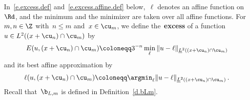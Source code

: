 \documentclass[11pt]{amsart}
\begin{document}
In~\eqref{e.excess.def} and~\eqref{e.excess.affine.def} below,~$\ell$ denotes an affine function on~$\Rd$, and the minimum and the minimizer are taken over all affine functions.  For~$m,n \in \Z$ with~$n \leq m$ and~$x \in \cu_m$, we define the~\textbf{excess} of a function~$u\in L^2((x +\cu_n) \cap \cu_m)$ by
\begin{equation}
	E(u,(x +\cu_n) \cap \cu_m)  \coloneqq
	3^{-n}
	\min_{\ell}
	\| u - \ell \|_{\underline{L}^2((x +\cu_n) \cap \cu_m)}
	\label{e.excess.def}
\end{equation}
and its best affine approximation by
\begin{equation}
	\ell (u,(x +\cu_n) \cap \cu_m)   \coloneqq  \argmin_{\ell}
	\| u - \ell \|_{\underline{L}^2((x +\cu_n) \cap \cu_m)}
	\,.
	\label{e.excess.affine.def}
\end{equation}
Recall that~$\b_{L,m}$ is defined in Definition~\ref{d.bLm}.
\end{document}
